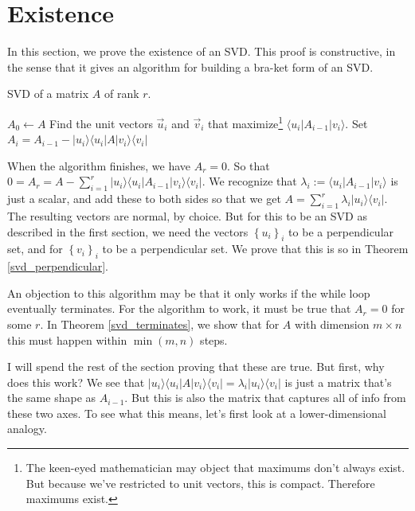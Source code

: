 \documentclass{amsbook}
\begin{document}
\section{Existence}

In this section, we prove the existence of an SVD.  This proof is constructive, in the sense that it gives an algorithm for building a bra-ket form of an SVD.

\begin{algorithm}
\caption{SVD of a matrix $A$ of rank $r$.}
\label{alg1}
\begin{algorithmic}
\State $A_0 \gets A$
	\State Find the unit vectors $\vec u _i$ and $\vec v _i$ that maximize\footnote{The keen-eyed mathematician may object that maximums don't always exist.  But because we've restricted to unit vectors, this is compact.  Therefore maximums exist.} $\langle u _i|A_{i-1}| v _i\rangle$.
	\State Set $A_i = A_{i-1}-| u _i\rangle\langle u _i|A| v _i\rangle\langle v _i|$
\EndWhile
\end{algorithmic}
\end{algorithm}

When the algorithm finishes, we have $A_r=0$.  So that $0=A_r=A-\sum_{i=1}^r| u _i\rangle\langle u _i|A_{i-1}| v _i\rangle\langle v _i|$.  We recognize that $\lambda_i:=\langle u _i|A_{i-1}| v _i\rangle$ is just a scalar, and add these to both sides so that we get $A=\sum_{i=1}^r\lambda_i| u _i\rangle\langle v _i|$.  The resulting vectors are normal, by choice.  But for this to be an SVD as described in the first section, we need the vectors $\left\{u_i\right\}_i$ to be a perpendicular set, and for $\left\{v_i\right\}_i$ to be a perpendicular set.  We prove that this is so in Theorem \ref{svd_perpendicular}.

An objection to this algorithm may be that it only works if the while loop eventually terminates.  For the algorithm to work, it must be true that $A_r=0$ for some $r$.  In Theorem \ref{svd_terminates}, we show that for $A$ with dimension $m\times n$ this must happen within $\min(m, n)$ steps.

I will spend the rest of the section proving that these are true.  But first, why does this work?  We see that $| u _i\rangle\langle u _i|A| v _i\rangle\langle v _i|=\lambda_i| u _i\rangle\langle v _i|$ is just a matrix that's the same shape as $A_{i-1}$.  But this is also the matrix that captures all of info from these two axes.  To see what this means, let's first look at a lower-dimensional analogy.
\end{document}
